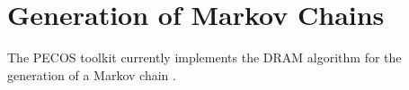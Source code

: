 \chapter{Generation of Markov Chains}\label{ch-mcmc}
\thispagestyle{headings}

The PECOS toolkit currently implements the DRAM algorithm  for the generation of a Markov chain \cite{HaLaMiSa06}.
